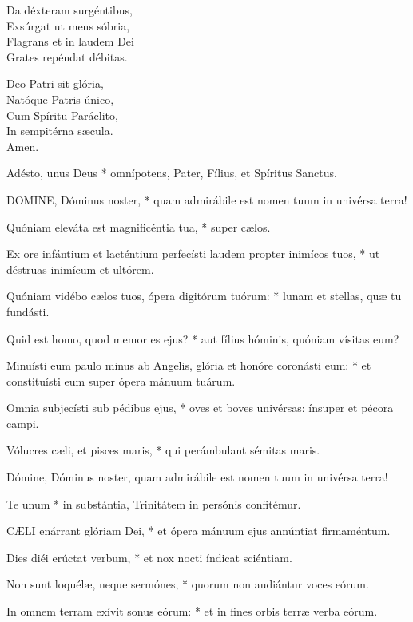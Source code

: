 Da déxteram surgéntibus,\\
Exsúrgat ut mens sóbria,\\
Flagrans et in laudem Dei\\
Grates repéndat débitas.

Deo Patri sit glória,\\
Natóque Patris único,\\
Cum Spíritu Paráclito,\\
In sempitérna sæcula.\\
Amen.


 Adésto, unus Deus * omnípotens, Pater, Fílius, et Spíritus Sanctus.


\lettrine[lines=2]{D}{OMINE}, Dóminus noster, * quam admirábile est nomen tuum in univérsa terra!

Quóniam eleváta est magnificéntia tua, * super cælos.

Ex ore infántium et lacténtium perfecísti laudem propter inimícos tuos, * ut déstruas inimícum et ultórem.

Quóniam vidébo cælos tuos, ópera digitórum tuórum: * lunam et stellas, quæ tu fundásti.

Quid est homo, quod memor es ejus? * aut fílius hóminis, quóniam vísitas eum?

Minuísti eum paulo minus ab Angelis, glória et honóre coronásti eum: * et constituísti eum super ópera mánuum tuárum.

Omnia subjecísti sub pédibus ejus, * oves et boves univérsas: ínsuper et pécora campi.

Vólucres cæli, et pisces maris, * qui perámbulant sémitas maris.

 Dómine, Dóminus noster, quam admirábile est nomen tuum in univérsa terra!

 Te unum * in substántia, Trinitátem in persónis confitémur.


\lettrine[lines=2]{C}{ÆLI} enárrant glóriam Dei, * et ópera mánuum ejus annúntiat firmaméntum.

Dies diéi erúctat verbum, * et nox nocti índicat sciéntiam.

Non sunt loquélæ, neque sermónes, * quorum non audiántur voces eórum.

In omnem terram exívit sonus eórum: * et in fines orbis terræ verba eórum.

